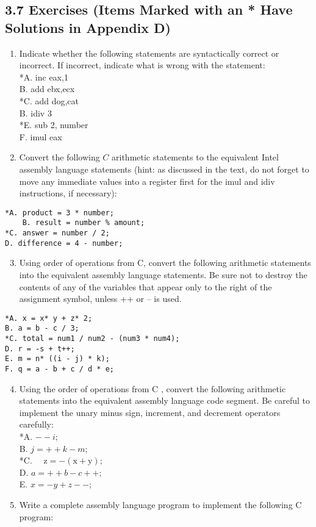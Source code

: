\documentclass[10pt]{article}
\begin{document}
\subsection*{3.7 Exercises (Items Marked with an * Have Solutions in Appendix D)}
\begin{enumerate}
  \item Indicate whether the following statements are syntactically correct or incorrect. If incorrect, indicate what is wrong with the statement:\\
*A. inc eax,1\\
B. add ebx,ecx\\
*C. add dog,cat\\
B. idiv 3\\
*E. sub 2, number\\
F. imul eax
  \item Convert the following $C$ arithmetic statements to the equivalent Intel assembly language statements (hint: as discussed in the text, do not forget to move any immediate values into a register first for the imul and idiv instructions, if necessary):
\end{enumerate}

\begin{verbatim}
*A. product = 3 * number;
    B. result = number % amount;
*C. answer = number / 2;
D. difference = 4 - number;
\end{verbatim}

\begin{enumerate}
  \setcounter{enumi}{2}
  \item Using order of operations from C, convert the following arithmetic statements into the equivalent assembly language statements. Be sure not to destroy the contents of any of the variables that appear only to the right of the assignment symbol, unless ++ or -- is used.
\end{enumerate}

\begin{verbatim}
*A. x = x* y + z* 2;
B. a = b - c / 3;
*C. total = num1 / num2 - (num3 * num4);
D. r = -s + t++;
E. m = n* ((i - j) * k);
F. q = a - b + c / d * e;
\end{verbatim}

\begin{enumerate}
  \setcounter{enumi}{3}
  \item Using the order of operations from C , convert the following arithmetic statements into the equivalent assembly language code segment. Be careful to implement the unary minus sign, increment, and decrement operators carefully:\\
*A. $--i$;\\
B. $j=++k-m ;$\\
*C. $\quad \mathrm{z}=-(\mathrm{x}+\mathrm{y})$;\\
D. $a=++b-c++;$\\
E. $x=-y+z--$;
  \item Write a complete assembly language program to implement the following C program:
\end{enumerate}
\end{document}
